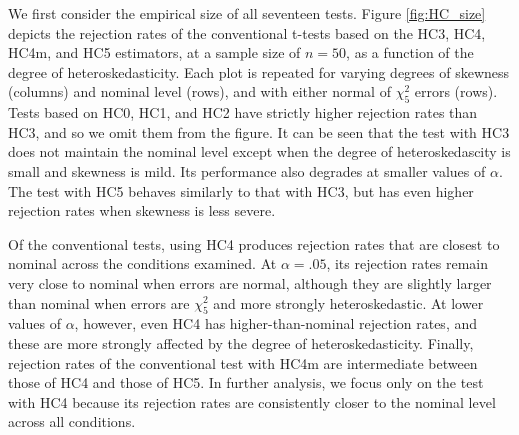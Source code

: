 \documentclass[12pt]{article}\usepackage[]{graphicx}\usepackage[]{color}
\begin{document}
We first consider the empirical size of all seventeen tests. Figure \ref{fig:HC_size} depicts the rejection rates of the conventional t-tests based on the HC3, HC4, HC4m, and HC5 estimators, at a sample size of $n = 50$, as a function of the degree of heteroskedasticity. Each plot is repeated for varying degrees of skewness (columns) and nominal level (rows), and with either normal of $\chi^2_5$ errors (rows). Tests based on HC0, HC1, and HC2 have strictly higher rejection rates than HC3, and so we omit them from the figure. It can be seen that the test with HC3 does not maintain the nominal level except when the degree of heteroskedascity is small and skewness is mild. Its performance also degrades at smaller values of $\alpha$. The test with HC5 behaves similarly to that with HC3, but has even higher rejection rates when skewness is less severe. 

Of the conventional tests, using HC4 produces rejection rates that are closest to nominal across the conditions examined. At $\alpha = .05$, its rejection rates remain very close to nominal when errors are normal, although they are slightly larger than nominal when errors are $\chi^2_5$ and more strongly heteroskedastic. At lower values of $\alpha$, however, even HC4 has higher-than-nominal rejection rates, and these are more strongly affected by the degree of heteroskedasticity. Finally, rejection rates of the conventional test with HC4m are intermediate between those of HC4 and those of HC5. In further analysis, we focus only on the test with HC4 because its rejection rates are consistently closer to the nominal level across all conditions. 
\end{document}
